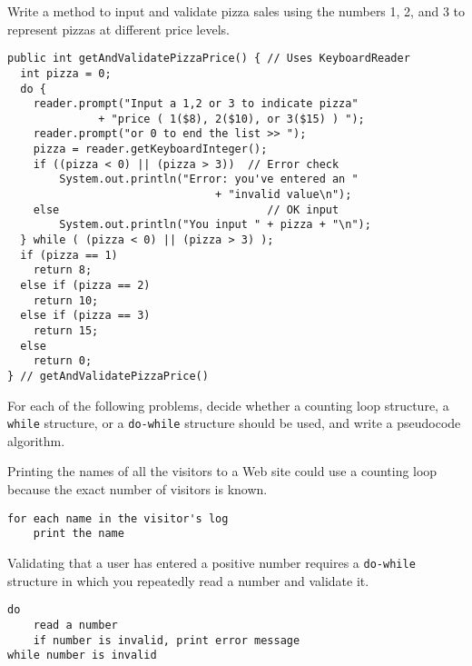 \begin{ANS}
\item  Write a method to input and validate pizza sales using the numbers
1, 2, and 3 to represent pizzas at different price levels.

\begin{jjjlisting}
\begin{lstlisting}[basicstyle=\scriptsize]
public int getAndValidatePizzaPrice() { // Uses KeyboardReader
  int pizza = 0;
  do {
    reader.prompt("Input a 1,2 or 3 to indicate pizza" 
              + "price ( 1($8), 2($10), or 3($15) ) ");
    reader.prompt("or 0 to end the list >> ");
    pizza = reader.getKeyboardInteger();
    if ((pizza < 0) || (pizza > 3))  // Error check
        System.out.println("Error: you've entered an " 
                                + "invalid value\n");  
    else                                // OK input
        System.out.println("You input " + pizza + "\n"); 
  } while ( (pizza < 0) || (pizza > 3) );
  if (pizza == 1)
    return 8;
  else if (pizza == 2)
    return 10;
  else if (pizza == 3)
    return 15;
  else
    return 0;
} // getAndValidatePizzaPrice()
\end{lstlisting}
\end{jjjlisting}

\item  For each of the following problems, decide whether
a counting loop structure, a {\tt while} structure, or a
{\tt do-while} structure should be used, and write a
pseudocode algorithm.

\begin{ANSBL}
\item  Printing the names of all the visitors to
a Web site could use a counting loop because the
exact number of visitors is known.

\begin{jjjlisting}
\begin{lstlisting}[basicstyle=\scriptsize]
for each name in the visitor's log
    print the name
\end{lstlisting}
\end{jjjlisting}


\item  Validating that a user has entered a positive
number requires a {\tt do-while} structure in which
you repeatedly read a number and validate it.

\begin{jjjlisting}
\begin{lstlisting}[basicstyle=\scriptsize]
do
    read a number
    if number is invalid, print error message
while number is invalid
\end{lstlisting}
\end{jjjlisting}


\end{ANSBL}
\end{ANS}
